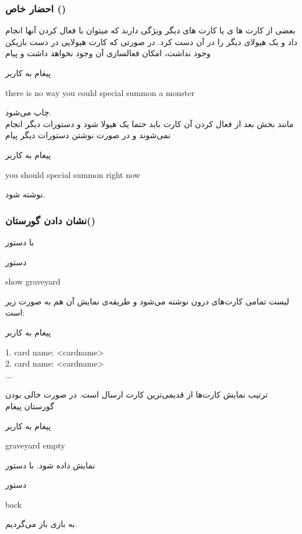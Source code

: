 \documentclass[]{article}
\begin{document}
\subsubsection*{{\titr احضار خاص ()}}
بعضی از کارت ها ی  یا کارت های دیگر ویژگی دارند که میتوان 
با فعال کردن آنها  انجام داد و یک هیولای دیگر را در آن 
دست 
 کرد. در صورتی که کارت هیولایی در دست بازیکن وجود نداشت، امکان 
فعالسازی آن  وجود نخواهد داشت و پیام 
\begin{mybox}[colback=yellow]{پیغام به کاربر}
	\begin{latin}	
		there is no way you could special summon a monster
	\end{latin}
\end{mybox}
چاپ می‌شود.
\\
مانند بخش  بعد از فعال کردن آن کارت باید حتما یک هیولا 
 شود و دستورات دیگر انجام نمی‌شوند و در صورت نوشتن دستورات دیگر 
پیام
\begin{mybox}[colback=yellow]{پیغام به کاربر}
	\begin{latin}	
		you should special summon right now
	\end{latin}
\end{mybox}
نوشته شود.

\subsubsection*{{\titr نشان دادن گورستان()}}
با دستور 
\begin{mybox}[colback=yellow]{دستور}
	\begin{latin}	
		show graveyard
	\end{latin}
\end{mybox}
لیست تمامی کارت‌های درون  نوشته می‌شود و طریقه‌ی نمایش آن هم به 
صورت زیر است:
\begin{mybox}[colback=yellow]{پیغام به کاربر}
	\begin{latin}	
		1. card name: <cardname>\\
		2. card name: <cardname>\\
		...
	\end{latin}
\end{mybox}
ترتیب نمایش کارت‌ها از قدیمی‌ترین کارت ارسال  است. در صورت خالی بودن گورستان 
پیغام
\begin{mybox}[colback=yellow]{پیغام به کاربر}
	\begin{latin}	
		graveyard empty
	\end{latin}
\end{mybox}
نمایش داده شود. با دستور
\begin{mybox}[colback=yellow]{دستور}
	\begin{latin}	
		back
	\end{latin}
\end{mybox}
به بازی باز می‌گردیم.
\end{document}
